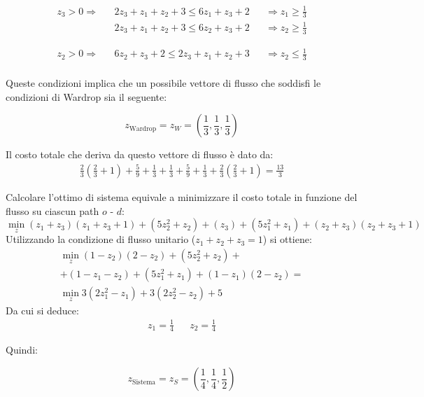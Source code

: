 \documentclass[11pt,largemargins]{homework}
\begin{document}
\begin{alphaparts}
  \begin{align*}
    z_3>0 \Rightarrow && 2z_3+z_1+z_2+3 \leq 6z_1 + z_3 + 2 && \Rightarrow z_1 \geq \frac{1}{3}\\
    && 2z_3+z_1+z_2+3 \leq 6z_2 + z_3 + 2 && \Rightarrow z_2 \geq \frac{1}{3}
  \end{align*}

  \begin{align*}
    z_2>0 \Rightarrow && 6z_2 + z_3 + 2 \leq 2z_3+z_1+z_2+3 && \Rightarrow z_2 \leq \frac{1}{3}\\
  \end{align*}
  
  Queste condizioni implica che un possibile vettore di flusso che soddisfi le condizioni di Wardrop sia il seguente:

  \begin{equation*}
    z_{\text{Wardrop}} = z_W = \left(\frac{1}{3},\frac{1}{3},\frac{1}{3}\right)
  \end{equation*}

  Il costo totale che deriva da questo vettore di flusso è dato da:
  \begin{align*}
    \frac{2}{3}\left(\frac{2}{3}+1 \right) + \frac{5}{9} + \frac{1}{3} + \frac{1}{3} + \frac{5}{9} + \frac{1}{3} + \frac{2}{3}\left(\frac{2}{3}+1 \right) = \frac{13}{3}
  \end{align*}

  \questionpart

  Calcolare l'ottimo di sistema equivale a minimizzare il costo totale in funzione del flusso su ciascun path \(o\) - \(d\):
  \begin{equation*}
    \min\limits_z (z_1+z_3)(z_1+z_3+1)+(5z_2^2+z_2)+(z_3)+(5z_1^2+z_1)+(z_2+z_3)(z_2+z_3+1)
  \end{equation*}
  Utilizzando la condizione di flusso unitario (\(z_1+z_2+z_3=1\)) si ottiene:
  \begin{eqnarray*}
    \min\limits_z (1-z_2)(2-z_2)+(5z_2^2+z_2)+\\
    +(1-z_1-z_2)+(5z_1^2+z_1)+(1-z_1)(2-z_2)=\\
    \min\limits_z 3(2z_1^2-z_1)+3(2z_2^2-z_2)+5
  \end{eqnarray*}
  Da cui si deduce:
  \begin{align*}
    z_1=\frac{1}{4} && z_2 = \frac{1}{4}
  \end{align*}

  Quindi:

  \begin{equation*}
    z_{\text{Sistema}}=z_S=\left(\frac{1}{4},\frac{1}{4},\frac{1}{2}\right)
  \end{equation*}

  \end{alphaparts}
\end{document}
